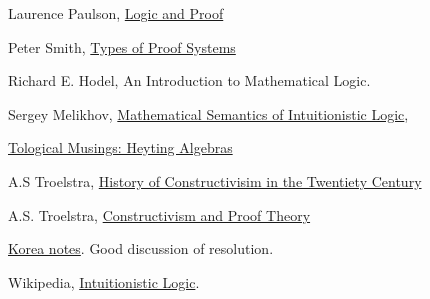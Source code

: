 \begin{thebibliography}
 Laurence Paulson, \href{https://www.cl.cam.ac.uk/teaching/1112/LogicProof/logic-notes.pdf}{Logic and Proof}

 Peter Smith, \href{https://www.logicmatters.net/resources/pdfs/ProofSystems.pdf}{Types of Proof Systems}

 Richard E. Hodel, An Introduction to Mathematical Logic.  

 Sergey Melikhov, \href{https://arxiv.org/pdf/1504.03380.pdf}{Mathematical Semantics of Intuitionistic Logic}, 

 \href{https://topologicalmusings.wordpress.com/2008/04/08/distributivity-topology-and-heyting-algebras/}{Tological Musings: Heyting Algebras}

 A.S Troelstra, \href{http://www.illc.uva.nl/Research/Publications/Reports/ML-1991-05.text.pdf}{History of Constructivisim in the Twentiety Century}

 A.S. Troelstra, \href{http://citeseerx.ist.psu.edu/viewdoc/download?doi=10.1.1.10.6972&rep=rep1&type=pdf}{Constructivism and Proof Theory}

 \href{http://www1.se.cuhk.edu.hk/~seem5750/Lecture_6.pdf}{Korea notes}. Good discussion of resolution.

 Wikipedia, \href{https://en.wikipedia.org/wiki/Intuitionistic_logic}{Intuitionistic Logic}. 

\end{thebibliography}
